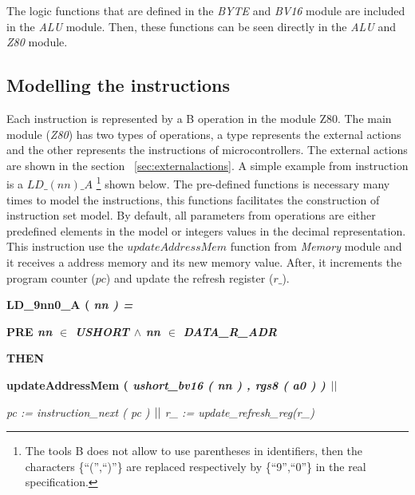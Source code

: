 \documentclass[11pt]{article} %
\newcommand{\footnoteremember}[2]{
  \footnote{#2}
  \newcounter{#1}
  \setcounter{#1}{\value{footnote}}
}
\begin{document}
The logic functions that are defined in the \textit{BYTE} and \textit{BV16}
module are included in the \textit{ALU} module. Then, these functions can be seen
directly in the \textit{ALU} and \textit{Z80} module.

\subsection{Modelling the instructions}

Each instruction is represented by a B operation in the module Z80. The main
module (\textit{Z80}) has two types of operations, a type represents the external
actions and the other represents the instructions of microcontrollers. The
external actions are shown in the section ~\ref{sec:externalactions}.  A simple
example from instruction is a
$\mathit{LD\_(nn)\_A}$\footnoteremember{myfootnote}{The tools B does not allow
to use parentheses in identifiers, then the characters \{``('',``)''\} are
replaced respectively by \{``9'',``0''\} in the real specification.} shown below. The
pre-defined functions is necessary many times to model the instructions, this
functions facilitates the construction of instruction set model. By default, all
parameters from operations are either predefined elements in the model or
integers values in the decimal representation. This instruction use the
$\mathit{updateAddressMem}$ function from \textit{Memory} module and it receives
a address memory and its new memory value. After, it increments the program
counter ($\mathit{pc}$) and update the refresh register ($\mathit{r\_}$).


\hspace*{0.00in}\bf LD\_9nn0\_A \rm ( \it nn \rm ) \rm =

\hspace*{0.20in}\bf PRE \it nn $\in$ \it USHORT\hspace*{0.15in} $\land$ \hspace*{0.10in}\it nn\hspace*{0.10in} $\in$  \it DATA\_R\_ADR

\hspace*{0.20in}\bf THEN

\hspace*{0.20in}\bf updateAddressMem \rm ( \it ushort\_bv16 \rm ( \it nn \rm ) \rm , \it rgs8 \rm ( \it a0 \rm )
\rm )  $\mbox{$\mid\mid$}$

\hspace*{0.20in}\it pc \rm := \it instruction\_next \rm ( \it pc \rm )  $\mbox{$\mid\mid$}$  \it r\_ \rm := \it update\_refresh\_reg\rm (\it r\_\rm )
\end{document}
